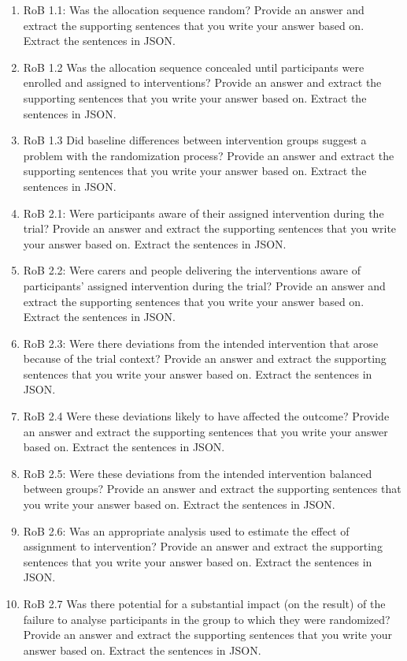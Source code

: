 \documentclass[sn-mathphys,Numbered]{sn-jnl}%
\begin{document}
\begin{enumerate}
    \item RoB 1.1: Was the allocation sequence random?  Provide an answer and extract the supporting sentences that you write your answer based on. Extract the sentences in JSON.
    \item RoB 1.2 Was the allocation sequence concealed until participants were enrolled and assigned to interventions? Provide an answer and extract the supporting sentences that you write your answer based on. Extract the sentences in JSON.
    \item RoB 1.3 Did baseline differences between intervention groups suggest a problem with the randomization process?  Provide an answer and extract the supporting sentences that you write your answer based on. Extract the sentences in JSON.
    \item RoB 2.1: Were participants aware of their assigned intervention during the trial? Provide an answer and extract the supporting sentences that you write your answer based on. Extract the sentences in JSON.
    \item RoB 2.2: Were carers and people delivering the interventions aware of participants' assigned intervention during the trial? Provide an answer and extract the supporting sentences that you write your answer based on. Extract the sentences in JSON.
    \item RoB 2.3: Were there deviations from the intended intervention that arose because of the trial context? Provide an answer and extract the supporting sentences that you write your answer based on. Extract the sentences in JSON.
    \item RoB 2.4 Were these deviations likely to have affected the outcome? Provide an answer and extract the supporting sentences that you write your answer based on. Extract the sentences in JSON.
    \item RoB 2.5: Were these deviations from the intended intervention balanced between groups? Provide an answer and extract the supporting sentences that you write your answer based on. Extract the sentences in JSON.
    \item RoB 2.6: Was an appropriate analysis used to estimate the effect of assignment to intervention? Provide an answer and extract the supporting sentences that you write your answer based on. Extract the sentences in JSON.
    \item RoB 2.7 Was there potential for a substantial impact (on the result) of the failure to analyse participants in the group to which they were randomized?  Provide an answer and extract the supporting sentences that you write your answer based on. Extract the sentences in JSON.

\end{enumerate}
\end{document}
